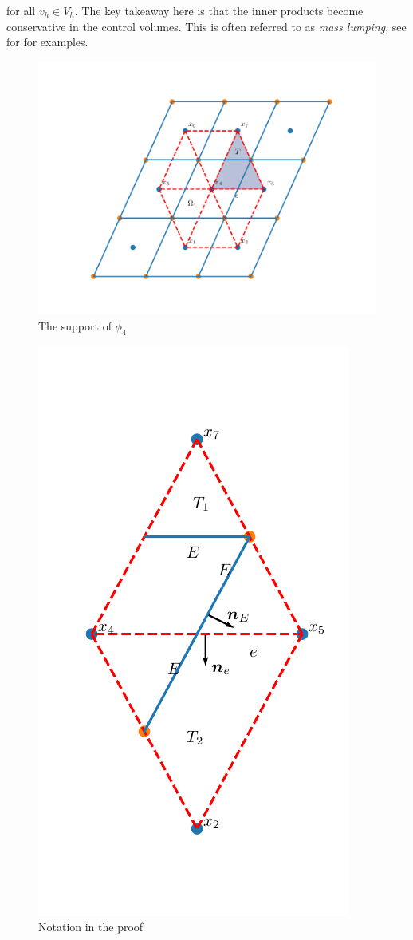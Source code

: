 \documentclass[../Main/main.tex]{subfiles}
\begin{document}
	for all $v_h\in V_h$. 
	The key takeaway here is that the inner products become conservative in the control volumes. This is often referred to as \emph{mass lumping}, see for \cite{baranger1996connection} for examples.  
	\par
		\begin{figure}[H]
		\centering
		\includegraphics[width=1\textwidth]{Control volume.pdf}
		\caption{The support of $\phi_4$}
		\label{fig:control volume}
	\end{figure}
	\begin{figure}[H]
		\centering
		\includegraphics{two triangles.pdf}
		\caption{Notation in the proof}
		\label{fig:two triangles}
	\end{figure}
\end{document}
